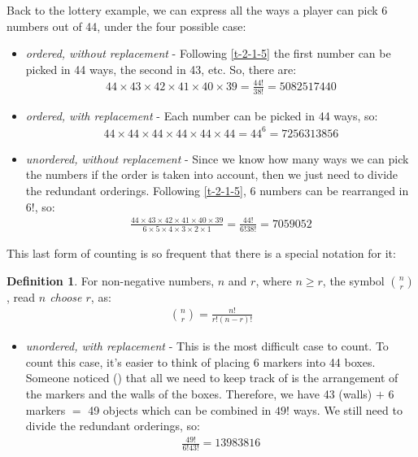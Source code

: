 \documentclass[
  oneside,
  11pt, a4paper,
  footinclude=true,
  headinclude=true,
  cleardoublepage=empty
]{scrbook}
\theoremstyle{definition}
\newtheorem{definition}{Definition}[section]
\theoremstyle{definition}
\begin{document}
        Back to the lottery example, we can express all the ways a player can pick 6 numbers out of 44, under the four possible case:
        
        \begin{itemize}
            \item \emph{ordered, without replacement} - Following \ref{t-2-1-5} the first number can be picked in 44 ways, the second in 43, etc. So, there are:
            \begin{align*}
                44 \times 43 \times 42 \times 41 \times 40 \times 39 = \frac{44!}{38!} = 5082517440
            \end{align*}{}
            \item \emph{ordered, with replacement} - Each number can be picked in 44 ways, so:
            \begin{align*}
                44 \times 44 \times 44 \times 44 \times 44 \times 44 = 44^6 = 7256313856
            \end{align*}{}
            \item \emph{unordered, without replacement} - Since we know how many ways we can pick the numbers if the order is taken into account, then we just need to divide the redundant orderings. Following \ref{t-2-1-5}, 6 numbers can be rearranged in $6!$, so:
            \begin{align*}
                \frac{44 \times 43 \times 42 \times 41 \times 40 \times 39}{6 \times 5 \times 4 \times 3 \times 2 \times 1} = \frac{44!}{6!38!} = 7059052
            \end{align*}{}
        \end{itemize}{}
        
        This last form of counting is so frequent that there is a special notation for it:
        
        \begin{definition}{For non-negative numbers, $n$ and $r$, where $n \geq r$, the symbol $\binom{n}{r}$, read \emph{$n$ choose $r$}, as:}
            \begin{align*}
                \binom{n}{r} = \frac{n!}{r!(n-r)!}
            \end{align*}{}
        \end{definition}{}
       \begin{itemize}
            \item \emph{unordered, with replacement} - This is the most difficult case to count. To count this case, it's easier to think of placing 6 markers into 44 boxes. Someone noticed (\cite{feller-vol-2}) that all we need to keep track of is the arrangement of the markers and the walls of the boxes. Therefore, we have 43 (walls) $+$ 6 markers $=$ 49 objects which can be combined in $49!$ ways. We still need to divide the redundant orderings, so: 
            \begin{align*}
                \frac{49!}{6!43!} = 13983816
            \end{align*}{}
        \end{itemize}{}
        
\end{document}
